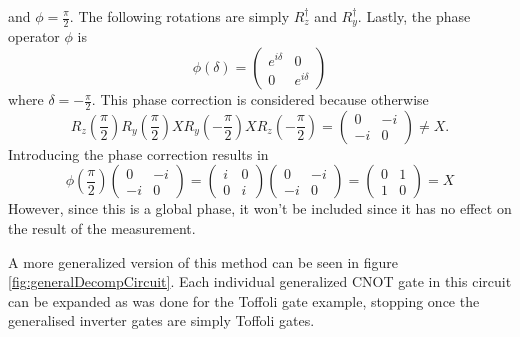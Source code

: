 \documentclass[../../dissertation.tex]{subfiles}
\begin{document}
and $\phi = \frac{\pi}{2}$. The following rotations are simply $R_z^\dagger$ and $R_y^\dagger$. Lastly, the phase operator $\phi$ is 
\begin{equation}
	\phi(\delta) = \begin{pmatrix}
		e^{i\delta} & 0 \\
		0 & e^{i\delta}
		 \end{pmatrix}
\end{equation}
where $\delta = -\frac{\pi}{2}$. This phase correction is considered because otherwise
\begin{equation}
	R_z(\frac{\pi}{2})R_y(\frac{\pi}{2})XR_y(-\frac{\pi}{2})XR_z(-\frac{\pi}{2}) = 
	\begin{pmatrix}
		0 & -i \\
		-i & 0
		 \end{pmatrix} \neq X.
\end{equation}
Introducing the phase correction results in
\begin{equation}
	\phi(\frac{\pi}{2}) 
	\begin{pmatrix}
		0 & -i \\
		-i & 0
		 \end{pmatrix} =  
	\begin{pmatrix}
		i & 0 \\
		0 & i
		 \end{pmatrix}   
	\begin{pmatrix}
		0 & -i \\
		-i & 0
		 \end{pmatrix} =   
	\begin{pmatrix}
		0 & 1 \\
		1 & 0
		 \end{pmatrix} = X  
\end{equation}
However, since this is a global phase, it won't be included since it has no effect on the result of the measurement.\par
A more generalized version of this method can be seen in figure \ref{fig:generalDecompCircuit}. Each individual generalized CNOT gate in this circuit can be expanded as was done for the Toffoli gate example, stopping once the generalised inverter gates are simply Toffoli gates.
\end{document}
